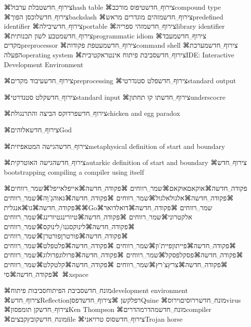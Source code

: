 ⌘צירוף␣חדש{טבלת ערבול}{hash table}
⌘צירוף␣חדש{טיפוס מורכב}{compound type}
⌘צירוף␣חדש{לוכסן הפוך}{backslash}
⌘צירוף␣חדש{מזהים מוגדרים מראש}{predefined identifier}
⌘צירוף␣חדש{יבילה}{portable}
⌘צירוף␣חדש{מזהי ספריה}{library identifier}
⌘צירוף␣חדש{מטבע לשון תכנותית}{programmatic idiom}
⌘צירוף␣חדש{מעבד מקדים}{preprocessor}
⌘צירוף␣חדש{מעטפת פקודות}{command shell}
⌘צירוף␣חדש{מערכת הפעלה}{operating system}
⌘צירוף␣חדש{סביבת פיתוח אינטראקטיבית}{IDE: Interactive Development Environment}


⌘צירוף␣חדש{עיבוד מקדים}{preprocessing}
⌘צירוף␣חדש{פלט סטנדרטי}{standard output}

⌘צירוף␣חדש{קלט סטנדרטי}{standard input}
⌘צירוף␣חדש{תו קו תחתון}{underscocre}

⌘צירוף␣חדש{פרדוקס הביצה והתרנגולת}{chicken and egg paradox}


⌘צירוף␣חדש{אלוהים}{God}


⌘צירוף␣חדש{הגישה המטאפיזית}{metaphysical definition of start and boundary}


⌘צירוף␣חדש{הגישה האוטרקית}{autarkic definition of start and boundary}
⌘צירוף␣חדש{ bootstrapping} {compiling a compiler using itself}



⌘פקודה␣חדשה⌘אוקאם{אוקאם⌘שמר␣רווחים}
⌘פקודה␣חדשה⌘אייפל{אייפל⌘שמר␣רווחים}
⌘פקודה␣חדשה⌘אלגול{אלגול⌘שמר␣רווחים}
⌘פקודה␣חדשה⌘גאוה{גָ'וָה⌘שמר␣רווחים}
⌘פקודה␣חדשה⌘גו{⌘אנגלית{⌘Go}⌘שמר␣רווחים}
⌘פקודה␣חדשה⌘דואל{דואר אלקטרוני⌘שמר␣רווחים}
⌘פקודה␣חדשה⌘טיורינג{טיורינג⌘שמר␣רווחים}
⌘פקודה␣חדשה⌘לינוקס{גנו/לינוקס⌘שמר␣רווחים}
⌘פקודה␣חדשה⌘פורטרן{פורטרן⌘שמר␣רווחים}
⌘פקודה␣חדשה⌘פייתון{פיית'ון⌘שמר␣רווחים}
⌘פקודה␣חדשה⌘פלט{פלט⌘שמר␣רווחים}
⌘פקודה␣חדשה⌘פסקל{פסקל⌘שמר␣רווחים}
⌘פקודה␣חדשה⌘פרולוג{פרולוג⌘שמר␣רווחים}
⌘פקודה␣חדשה⌘צרץ{צ'רץ⌘שמר␣רווחים}
⌘פקודה␣חדשה⌘קלט{קלט⌘שמר␣רווחים}
⌘פקודה␣חדשה⌘סי{\unskip~⌘xspace}

⌘מונח␣חדש{סביבת הפיתוח}{סביבות פיתוח}{development environment}
⌘צירוף␣חדש{Reflection}{רפלקשן}
⌘צירוף␣חדש{דפסן}{Quine}
⌘מונח␣חדש{וירוסים}{וירוס}{virus}
⌘צירוף␣חדש{קן תומפסון}{Ken Thompson}
⌘מונח␣חדש{מהדר}{מהדרים}{compiler}
⌘מונח␣חדש{קובץ}{קבצים}{file}
⌘צירוף␣חדש{סוס טרויאני}{Trojan horse}
